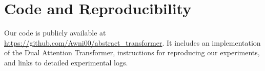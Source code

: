 \section*{Code and Reproducibility}

Our code is publicly available at \url{https://github.com/Awni00/abstract_transformer}. It includes an implementation of the Dual Attention Transformer, instructions for reproducing our experiments, and links to detailed experimental logs.